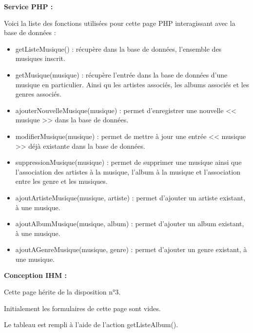 			\begin{paragraphe}
				\textbf{Service PHP :}
			\end{paragraphe}

			\begin{paragraphe}
				Voici la liste des fonctions utilisées pour cette page PHP interagissant avec la base de données :
			\end{paragraphe}

			\begin{paragraphe}
				\begin{itemize}
					\item getListeMusique() : récupère dans la base de données, l'ensemble des musiques inscrit.
					\item getMusique(musique) : récupère l'entrée dans la base de données d'une musique en particulier. Ainsi qu les artistes associés, les albums associés et les genres associés.
					\item ajouterNouvelleMusique(musique) : permet d'enregistrer une nouvelle << musique >> dans la base de données.
					\item modifierMusique(musique) : permet de mettre à jour une entrée << musique >> déjà existante dans la base de données.
					\item suppressionMusique(musique) : permet de supprimer une musique ainsi que l'association des artistes à la musique, l'album à la musique et l'association entre les genre et les musiques.
					\item ajoutArtisteMusique(musique, artiste) : permet d'ajouter un artiste existant, à une musique.
					\item ajoutAlbumMusique(musique, album) : permet d'ajouter un album existant, à une musique.
					\item ajoutAGenreMusique(musique, genre) : permet d'ajouter un genre existant, à une musique.
				\end{itemize}
			\end{paragraphe}

			\begin{paragraphe}
				\textbf{Conception IHM :}
			\end{paragraphe}

			\begin{paragraphe}
				Cette page hérite de la disposition n°3. \par
				Initialement les formulaires de cette page sont vides. \par
				Le tableau est rempli à l'aide de l'action getListeAlbum().
			\end{paragraphe}


